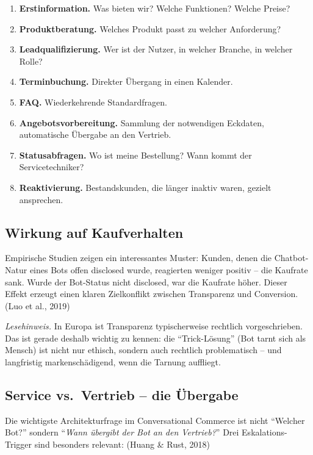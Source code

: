 \documentclass[11pt,a4paper,oneside]{article}
\newcommand{\fachbegriff}[1]{\textbf{#1}}
\newcommand{\quelle}[1]{{\footnotesize\color{lpGray}(#1)}}
\begin{document}
\begin{enumerate}
  \item \fachbegriff{Erstinformation.} Was bieten wir? Welche Funktionen? Welche Preise?
  \item \fachbegriff{Produktberatung.} Welches Produkt passt zu welcher Anforderung?
  \item \fachbegriff{Leadqualifizierung.} Wer ist der Nutzer, in welcher Branche, in welcher Rolle?
  \item \fachbegriff{Terminbuchung.} Direkter Übergang in einen Kalender.
  \item \fachbegriff{FAQ.} Wiederkehrende Standardfragen.
  \item \fachbegriff{Angebotsvorbereitung.} Sammlung der notwendigen Eckdaten, automatische Übergabe an den Vertrieb.
  \item \fachbegriff{Statusabfragen.} Wo ist meine Bestellung? Wann kommt der Servicetechniker?
  \item \fachbegriff{Reaktivierung.} Bestandskunden, die länger inaktiv waren, gezielt ansprechen.
\end{enumerate}

\subsection{Wirkung auf Kaufverhalten}

Empirische Studien zeigen ein interessantes Muster: Kunden, denen die Chatbot-Natur eines Bots offen disclosed wurde, reagierten weniger positiv -- die Kaufrate sank. Wurde der Bot-Status nicht disclosed, war die Kaufrate höher. Dieser Effekt erzeugt einen klaren Zielkonflikt zwischen Transparenz und Conversion. \quelle{Luo et al., 2019}

\noindent\emph{Lesehinweis.} In Europa ist Transparenz typischerweise rechtlich vorgeschrieben. Das ist gerade deshalb wichtig zu kennen: die ``Trick-Lösung'' (Bot tarnt sich als Mensch) ist nicht nur ethisch, sondern auch rechtlich problematisch -- und langfristig markenschädigend, wenn die Tarnung auffliegt.

\subsection{Service vs.\ Vertrieb -- die Übergabe}

Die wichtigste Architekturfrage im Conversational Commerce ist nicht ``Welcher Bot?'' sondern ``\emph{Wann übergibt der Bot an den Vertrieb?}'' Drei Eskalations-Trigger sind besonders relevant: \quelle{Huang \& Rust, 2018}
\end{document}
